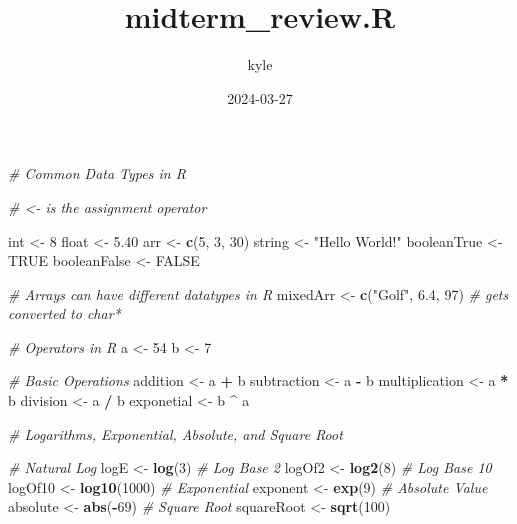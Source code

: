 \documentclass[
]{article}
\title{midterm\_review.R}
\author{kyle}
\date{2024-03-27}
\newenvironment{Shaded}{\begin{snugshade}}{\end{snugshade}}
\newcommand{\CommentTok}[1]{\textcolor[rgb]{0.56,0.35,0.01}{\textit{#1}}}
\newcommand{\ConstantTok}[1]{\textcolor[rgb]{0.56,0.35,0.01}{#1}}
\newcommand{\DecValTok}[1]{\textcolor[rgb]{0.00,0.00,0.81}{#1}}
\newcommand{\FloatTok}[1]{\textcolor[rgb]{0.00,0.00,0.81}{#1}}
\newcommand{\FunctionTok}[1]{\textcolor[rgb]{0.13,0.29,0.53}{\textbf{#1}}}
\newcommand{\NormalTok}[1]{#1}
\newcommand{\OtherTok}[1]{\textcolor[rgb]{0.56,0.35,0.01}{#1}}
\newcommand{\SpecialCharTok}[1]{\textcolor[rgb]{0.81,0.36,0.00}{\textbf{#1}}}
\newcommand{\StringTok}[1]{\textcolor[rgb]{0.31,0.60,0.02}{#1}}
\begin{document}
\maketitle

\begin{Shaded}
\begin{Highlighting}[]
\CommentTok{\# Common Data Types in R}

\CommentTok{\# \textless{}{-} is the assignment operator}

\NormalTok{int }\OtherTok{\textless{}{-}} \DecValTok{8}
\NormalTok{float }\OtherTok{\textless{}{-}} \FloatTok{5.40} 
\NormalTok{arr }\OtherTok{\textless{}{-}} \FunctionTok{c}\NormalTok{(}\DecValTok{5}\NormalTok{, }\DecValTok{3}\NormalTok{, }\DecValTok{30}\NormalTok{)}
\NormalTok{string }\OtherTok{\textless{}{-}} \StringTok{"Hello World!"}
\NormalTok{booleanTrue }\OtherTok{\textless{}{-}} \ConstantTok{TRUE}
\NormalTok{booleanFalse }\OtherTok{\textless{}{-}} \ConstantTok{FALSE}

\CommentTok{\# Arrays can have different datatypes in R}
\NormalTok{mixedArr }\OtherTok{\textless{}{-}} \FunctionTok{c}\NormalTok{(}\StringTok{"Golf"}\NormalTok{, }\FloatTok{6.4}\NormalTok{, }\DecValTok{97}\NormalTok{) }\CommentTok{\# gets converted to char*}

\CommentTok{\# Operators in R}
\NormalTok{a }\OtherTok{\textless{}{-}} \DecValTok{54}
\NormalTok{b }\OtherTok{\textless{}{-}} \DecValTok{7}

\CommentTok{\# Basic Operations}
\NormalTok{addition }\OtherTok{\textless{}{-}}\NormalTok{ a }\SpecialCharTok{+}\NormalTok{ b}
\NormalTok{subtraction }\OtherTok{\textless{}{-}}\NormalTok{ a }\SpecialCharTok{{-}}\NormalTok{ b}
\NormalTok{multiplication }\OtherTok{\textless{}{-}}\NormalTok{ a }\SpecialCharTok{*}\NormalTok{ b}
\NormalTok{division }\OtherTok{\textless{}{-}}\NormalTok{ a }\SpecialCharTok{/}\NormalTok{ b}
\NormalTok{exponetial }\OtherTok{\textless{}{-}}\NormalTok{  b }\SpecialCharTok{\^{}}\NormalTok{ a}

\CommentTok{\# Logarithms, Exponential, Absolute, and Square Root}

\CommentTok{\# Natural Log}
\NormalTok{logE }\OtherTok{\textless{}{-}} \FunctionTok{log}\NormalTok{(}\DecValTok{3}\NormalTok{)}
\CommentTok{\# Log Base 2}
\NormalTok{logOf2 }\OtherTok{\textless{}{-}} \FunctionTok{log2}\NormalTok{(}\DecValTok{8}\NormalTok{)}
\CommentTok{\# Log Base 10}
\NormalTok{logOf10 }\OtherTok{\textless{}{-}} \FunctionTok{log10}\NormalTok{(}\DecValTok{1000}\NormalTok{)}
\CommentTok{\# Exponential}
\NormalTok{exponent }\OtherTok{\textless{}{-}} \FunctionTok{exp}\NormalTok{(}\DecValTok{9}\NormalTok{)}
\CommentTok{\# Absolute Value}
\NormalTok{absolute }\OtherTok{\textless{}{-}} \FunctionTok{abs}\NormalTok{(}\SpecialCharTok{{-}}\DecValTok{69}\NormalTok{)}
\CommentTok{\# Square Root}
\NormalTok{squareRoot }\OtherTok{\textless{}{-}} \FunctionTok{sqrt}\NormalTok{(}\DecValTok{100}\NormalTok{)}


\end{Highlighting}
\end{Shaded}
\end{document}
